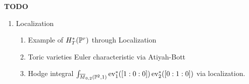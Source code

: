 \documentclass[12pt]{memoir}
\begin{document}
\textbf{TODO}
\begin{enumerate}
\item Localization
\begin{enumerate}
    \item Example of $H^\ast_T(\mathbb{P}^r)$ through Localization
    \item Toric varieties Euler characteristic via Atiyah-Bott
    \item Hodge integral $\int_{\overline M_{0,2}(\mathbb{P}^2,1)}\operatorname{ev}_1^\ast([1:0:0])\operatorname{ev}_2^\ast([0:1:0])$ via localization.
\end{enumerate}
\end{enumerate}
\ifx\nextra\undefined
\printindex
\else\fi
\nocite{*}


\end{document}
